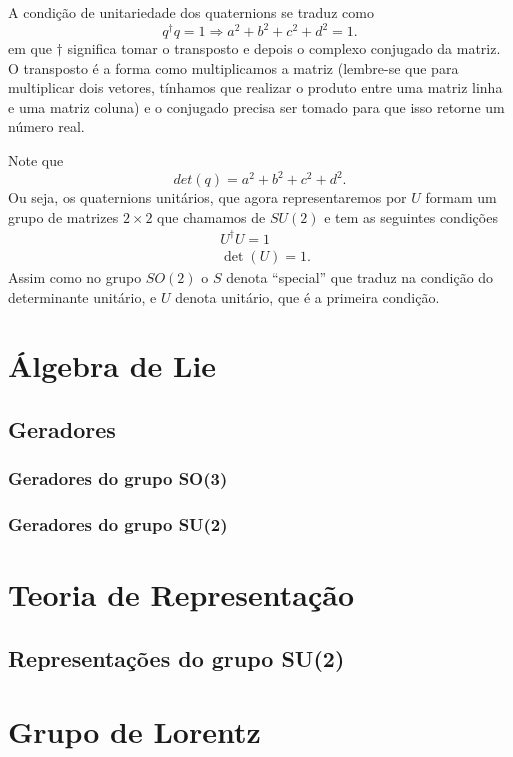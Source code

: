 \documentclass{article}
\numberwithin{equation}{section}
\numberwithin{figure}{section}
\begin{document}
A condição de unitariedade dos quaternions se traduz como 
\begin{equation}
	q^{\dagger}q=1\Rightarrow a^2+b^2+c^2+d^2=1.
\end{equation}
em que $\dagger$ significa tomar o transposto e depois o complexo conjugado da matriz. O transposto é a forma como multiplicamos a matriz (lembre-se que para multiplicar dois vetores, tínhamos que realizar o produto entre uma matriz linha e uma matriz coluna) e o conjugado precisa ser tomado para que isso retorne um número real. 

Note que 
\begin{equation}
	det(q)=a^2+b^2+c^2+d^2. 
\end{equation}
Ou seja, os quaternions unitários, que agora representaremos por $U$ formam um grupo de matrizes $2\times 2$ que chamamos de $SU(2)$ e tem as seguintes condições 
\begin{equation}
\begin{split}
	&U^{\dagger}U=1\\
	&\det(U)=1. 
\end{split}
\end{equation}
Assim como no grupo $SO(2)$ o $S$ denota ``special'' que traduz na condição do determinante unitário, e $U$ denota unitário, que é a primeira condição. 
\section{Álgebra de Lie}
\subsection{Geradores}
\subsubsection{Geradores do grupo SO(3)}
\subsubsection{Geradores do grupo SU(2)}
\section{Teoria de Representação}
\subsection{Representações do grupo SU(2)}
\section{Grupo de Lorentz}


\pagebreak
\nocite{*}


\end{document}
